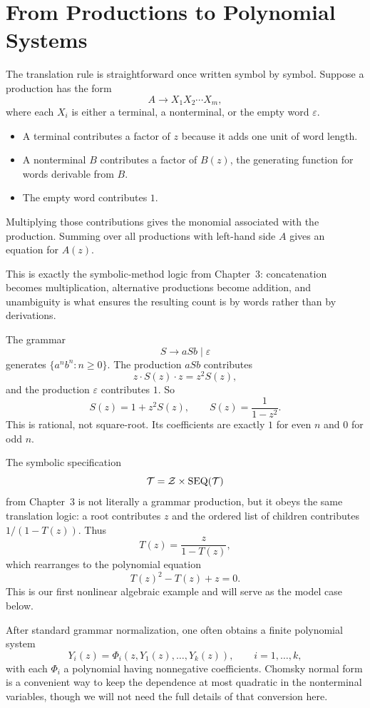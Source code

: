 \section{From Productions to Polynomial Systems}

The translation rule is straightforward once written symbol by symbol. Suppose a production has the form
\[
  A \to X_1 X_2 \cdots X_m,
\]
where each $X_i$ is either a terminal, a nonterminal, or the empty word $\varepsilon$.
\begin{itemize}
  \item A terminal contributes a factor of $z$ because it adds one unit of word length.
  \item A nonterminal $B$ contributes a factor of $B(z)$, the generating function for words derivable from $B$.
  \item The empty word contributes $1$.
\end{itemize}
Multiplying those contributions gives the monomial associated with the production. Summing over all productions with left-hand side $A$ gives an equation for $A(z)$.

This is exactly the symbolic-method logic from Chapter~3: concatenation becomes multiplication, alternative productions become addition, and unambiguity is what ensures the resulting count is by words rather than by derivations.

\begin{example}[$a^n b^n$]
The grammar
\[
  S \to aSb \mid \varepsilon
\]
generates $\{a^n b^n : n \ge 0\}$. The production $aSb$ contributes
\[
  z \cdot S(z) \cdot z = z^2 S(z),
\]
and the production $\varepsilon$ contributes $1$. So
\[
  S(z) = 1 + z^2 S(z),
  \qquad
  S(z) = \frac{1}{1-z^2}.
\]
This is rational, not square-root. Its coefficients are exactly $1$ for even $n$ and $0$ for odd $n$.
\end{example}

\begin{example}
The symbolic specification
\[
  \mathcal{T} = \mathcal{Z} \times \operatorname{SEQ}(\mathcal{T})
\]
from Chapter~3 is not literally a grammar production, but it obeys the same translation logic: a root contributes $z$ and the ordered list of children contributes $1/(1-T(z))$. Thus
\[
  T(z) = \frac{z}{1-T(z)},
\]
which rearranges to the polynomial equation
\[
  T(z)^2 - T(z) + z = 0.
\]
This is our first nonlinear algebraic example and will serve as the model case below.
\end{example}

After standard grammar normalization, one often obtains a finite polynomial system
\[
  Y_i(z) = \Phi_i(z,Y_1(z),\dots,Y_k(z)), \qquad i=1,\dots,k,
\]
with each $\Phi_i$ a polynomial having nonnegative coefficients. Chomsky normal form is a convenient way to keep the dependence at most quadratic in the nonterminal variables, though we will not need the full details of that conversion here.

